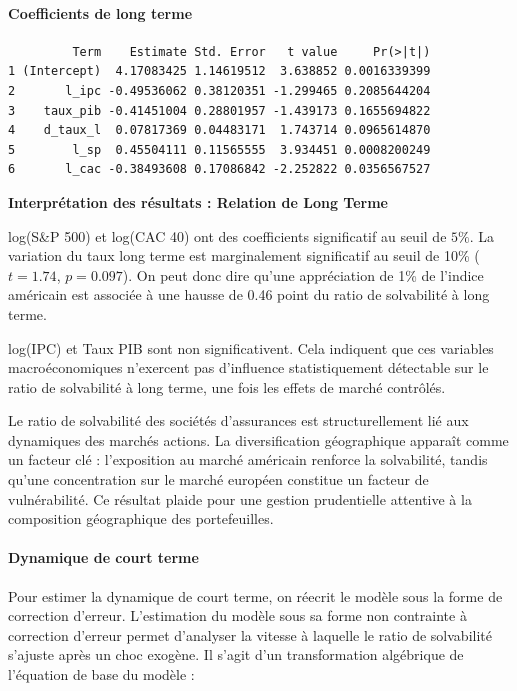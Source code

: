\documentclass[
]{article}
\begin{document}
\paragraph{Coefficients de long terme}\label{coefficients-de-long-terme}

\begin{verbatim}
         Term    Estimate Std. Error   t value     Pr(>|t|)
1 (Intercept)  4.17083425 1.14619512  3.638852 0.0016339399
2       l_ipc -0.49536062 0.38120351 -1.299465 0.2085644204
3    taux_pib -0.41451004 0.28801957 -1.439173 0.1655694822
4    d_taux_l  0.07817369 0.04483171  1.743714 0.0965614870
5        l_sp  0.45504111 0.11565555  3.934451 0.0008200249
6       l_cac -0.38493608 0.17086842 -2.252822 0.0356567527
\end{verbatim}

\textbf{Interprétation des résultats : Relation de Long Terme}

log(S\&P 500) et log(CAC 40) ont des coefficients significatif au seuil
de \(5\%\). La variation du taux long terme est marginalement
significatif au seuil de 10\% (\(t = 1.74\), \(p = 0.097\)). On peut
donc dire qu'une appréciation de 1\% de l'indice américain est associée
à une hausse de 0.46 point du ratio de solvabilité à long terme.

log(IPC) et Taux PIB sont non significativent. Cela indiquent que ces
variables macroéconomiques n'exercent pas d'influence statistiquement
détectable sur le ratio de solvabilité à long terme, une fois les effets
de marché contrôlés.

Le ratio de solvabilité des sociétés d'assurances est structurellement
lié aux dynamiques des marchés actions. La diversification géographique
apparaît comme un facteur clé : l'exposition au marché américain
renforce la solvabilité, tandis qu'une concentration sur le marché
européen constitue un facteur de vulnérabilité. Ce résultat plaide pour
une gestion prudentielle attentive à la composition géographique des
portefeuilles.

\paragraph{Dynamique de court terme}\label{dynamique-de-court-terme}

Pour estimer la dynamique de court terme, on réecrit le modèle sous la
forme de correction d'erreur. L'estimation du modèle sous sa forme non
contrainte à correction d'erreur permet d'analyser la vitesse à laquelle
le ratio de solvabilité s'ajuste après un choc exogène. Il s'agit d'un
transformation algébrique de l'équation de base du modèle :
\end{document}
